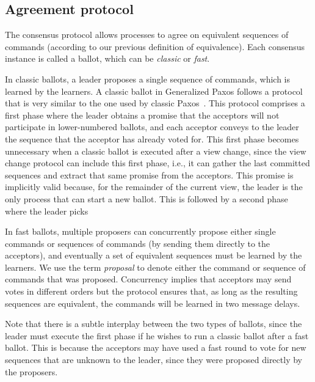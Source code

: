 \subsection{Agreement protocol} 

The consensus protocol allows processes to agree on equivalent sequences of commands (according to our previous definition of equivalence). Each consensus instance is called a ballot, which can be \textit{classic} or \textit{fast}. 

In classic ballots, a leader proposes a single sequence of commands, which is learned by the learners. 
A classic ballot in Generalized Paxos follows a protocol that is very similar to the one used by classic Paxos~\cite{paxos}. This protocol comprises a first phase where the leader obtains a promise that the acceptors will not participate in lower-numbered ballots, and each acceptor conveys to the leader the sequence that the acceptor has already voted for. This first phase becomes unnecessary when a classic ballot is executed after a view change, since the view change protocol can include this first phase, i.e., it can gather the last committed sequences and extract that same promise from the acceptors. This promise is implicitly valid because, for the remainder of the current view, the leader is the only process that can start a new ballot.  This is followed by a second phase where the leader picks 

In fast ballots, multiple proposers can concurrently propose either single commands or sequences of commands (by sending them directly to the acceptors), and eventually a set of equivalent sequences must be learned by the learners. We use the term \textit{proposal} to denote either the command or sequence of commands that was proposed.
Concurrency implies that acceptors may send votes in different orders but the protocol ensures that, as long as the resulting sequences are equivalent, the commands will be learned in two message delays. 

 Note that there is a subtle interplay between the two types of ballots, since the leader must execute the first phase if he wishes to run a classic ballot after a fast ballot. This is because the acceptors may have used a fast round to vote for new sequences that are unknown to the leader, since they were proposed directly by the proposers.

